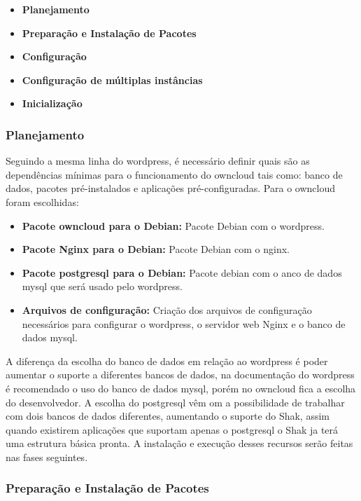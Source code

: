 \begin{itemize}
  \item  \textbf{Planejamento}
  \item  \textbf{Preparação e Instalação de Pacotes}
  \item  \textbf{Configuração}
  \item  \textbf{Configuração de múltiplas instâncias}
  \item  \textbf{Inicialização}
\end{itemize}

\subsubsection{Planejamento}

Seguindo a mesma linha do wordpress, é necessário definir quais são as dependências
mínimas para o funcionamento do owncloud tais como: banco de dados, pacotes
pré-instalados e aplicações pré-configuradas. Para o owncloud foram escolhidas:

\begin{itemize}
   \item \textbf{Pacote owncloud para o Debian:} Pacote Debian com o wordpress.
   \item \textbf{Pacote Nginx para o Debian:} Pacote Debian com o nginx.
   \item \textbf{Pacote postgresql para o Debian:} Pacote debian com o anco de dados mysql
   que será usado pelo wordpress.
   \item \textbf{Arquivos de configuração:} Criação dos arquivos de configuração
   necessários para configurar o wordpress, o servidor web Nginx e o banco de dados
   mysql.
\end{itemize}

A diferença da escolha do banco de dados em relação ao wordpress é poder aumentar
o suporte a diferentes bancos de dados, na documentação do wordpress é recomendado
o uso do banco de dados mysql, porém no owncloud fica a escolha do desenvolvedor.
A escolha do postgresql vêm om a possibilidade de trabalhar com dois bancos de
dados diferentes, aumentando o suporte do Shak, assim quando existirem aplicações
que suportam apenas o postgresql o Shak ja terá uma estrutura básica pronta.
A instalação e execução desses recursos serão feitas nas fases seguintes.

\subsubsection{Preparação e Instalação de Pacotes}

